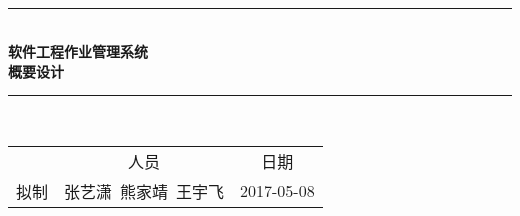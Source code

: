 \documentclass[bachelor]{ustcthesis}
\newcommand{\HRule}{\rule{\linewidth}{0.5mm}}
\begin{document}
\begin{titlepage}
\begin{center}
~\\[5cm]
\HRule \\[0.4cm]
{\huge \bfseries 软件工程作业管理系统\\概要设计}\\[0.4cm]
\HRule \\[1.5cm]

\begin{tabular}{ccc}
  & 人员 & 日期 \\ 
拟制 & 张艺潇\ 熊家靖\ 王宇飞 & 2017-05-08 \\ 
\end{tabular} 

\end{center}
\end{titlepage}



\frontmatter

\tableofcontents
\listoffigures
\listoftables
% 

\mainmatter











% 
% 
% 
% 
% 

\end{document}
